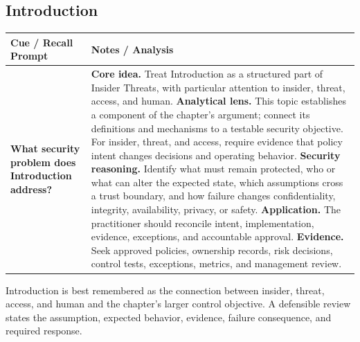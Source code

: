 \documentclass[11pt]{article}
\newcommand{\CornellHeader}{%
\rowcolor{Navy}\color{white}\bfseries Cue / Recall Prompt & \color{white}\bfseries Notes / Analysis\\\hline}
\newcommand{\CornellRow}[2]{%
\cellcolor{CueGray}\RaggedRight\textbf{#1} & \RaggedRight #2\\\hline}
\begin{document}
\subsection*{Introduction}
\begin{longtable}{>{\RaggedRight\arraybackslash}p{}|>{\RaggedRight\arraybackslash}p{}}
\CornellHeader
\CornellRow{What security problem does Introduction address?}{\textbf{Core idea.} Treat Introduction as a structured part of Insider Threats, with particular attention to insider, threat, access, and human. \textbf{Analytical lens.} This topic establishes a component of the chapter's argument; connect its definitions and mechanisms to a testable security objective. For insider, threat, and access, require evidence that policy intent changes decisions and operating behavior. \textbf{Security reasoning.} Identify what must remain protected, who or what can alter the expected state, which assumptions cross a trust boundary, and how failure changes confidentiality, integrity, availability, privacy, or safety. \textbf{Application.} The practitioner should reconcile intent, implementation, evidence, exceptions, and accountable approval. \textbf{Evidence.} Seek approved policies, ownership records, risk decisions, control tests, exceptions, metrics, and management review.}
\end{longtable}
\begin{topicsummary}
Introduction is best remembered as the connection between insider, threat, access, and human and the chapter's larger control objective. A defensible review states the assumption, expected behavior, evidence, failure consequence, and required response.
\end{topicsummary}
\end{document}
